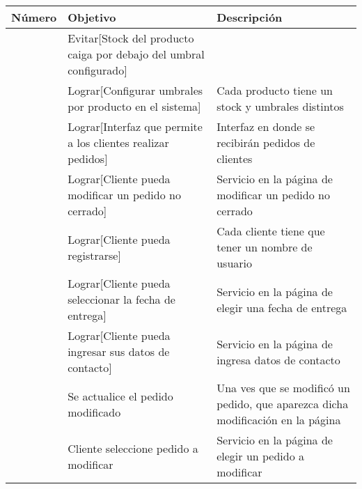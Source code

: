 \documentclass[a4paper]{article}
\begin{document}
\begin{table}[h]
\begin{tabular}{p{2cm} p{7cm} p{8cm}}
\rule{0pt}{1.2em} Número & Objetivo & Descripción\\[0.2em]
\hline

\rule{0pt}{1.2em} & Evitar[Stock del producto caiga por debajo del umbral configurado] & \\[0.2em]

\rule{0pt}{1.2em} & Lograr[Configurar umbrales por producto en el sistema] & Cada producto tiene un stock y umbrales distintos\\[0.2em]

\rule{0pt}{1.2em} & Lograr[Interfaz que permite a los clientes realizar pedidos] & Interfaz en donde se recibirán pedidos de clientes\\[0.2em]

\rule{0pt}{1.2em} & Lograr[Cliente pueda modificar un pedido no cerrado] & Servicio en la página de modificar un pedido no cerrado\\[0.2em]

\rule{0pt}{1.2em} & Lograr[Cliente pueda registrarse] & Cada cliente tiene que tener un nombre de usuario\\[0.2em]

\rule{0pt}{1.2em} & Lograr[Cliente pueda seleccionar la fecha de entrega] & Servicio en la página de elegir una fecha de entrega\\[0.2em]

\rule{0pt}{1.2em} & Lograr[Cliente pueda ingresar sus datos de contacto] & Servicio en la página de ingresa datos de contacto\\[0.2em]

\rule{0pt}{1.2em} & Se actualice el pedido modificado & Una ves que se modificó un pedido, que aparezca dicha modificación en la página\\[0.2em]

\rule{0pt}{1.2em} & Cliente seleccione pedido a modificar & Servicio en la página de elegir un pedido a modificar\\[0.2em]




\end{tabular}
\end{table}
\end{document}
